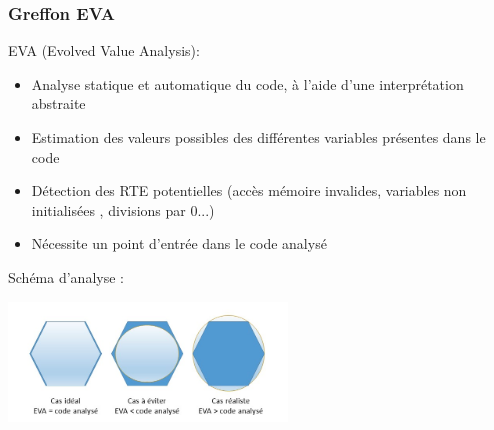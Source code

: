 \documentclass[french]{beamer}
\begin{document}

\begin{frame}
\frametitle{Greffon EVA}

EVA (Evolved Value Analysis):
\begin{itemize}
	\item Analyse statique et automatique du code, à l'aide d'une interprétation abstraite
	\item Estimation des valeurs possibles des différentes variables présentes dans le code
	\item Détection des RTE potentielles (accès mémoire invalides, variables non initialisées , divisions par 0...)
	\item Nécessite un point d'entrée dans le code analysé
\end{itemize}

\bigskip

Schéma d'analyse :


\begin{center}
 \includegraphics[height=3.2cm]{images/schema_analyse_eva.png}
\end{center}


\end{frame}
\end{document}
